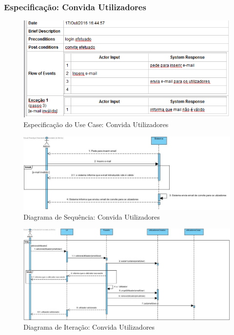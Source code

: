\subsubsection{Especificação: Convida Utilizadores }

\begin{figure}[htb!]
	\centering
	\includegraphics[scale=0.7]{imagens/Especificacoes/convidautilizadores}  
	\caption{Especificação do Use Case: Convida Utilizadores}  
\end{figure}

\begin{figure}[htb!]
	\centering
	\includegraphics[scale=0.5]{imagens/diagramaSeq/ConvidaUtilizadores}  
	\caption{Diagrama de Sequência: Convida Utilizadores }  
\end{figure}

\begin{figure}[htb!]
	\centering
	\includegraphics[scale=0.46]{imagens/diagramaIt/AdicionarUtilizadorGrupo}  
	\caption{Diagrama de Iteração: Convida Utilizadores }  
\end{figure}




